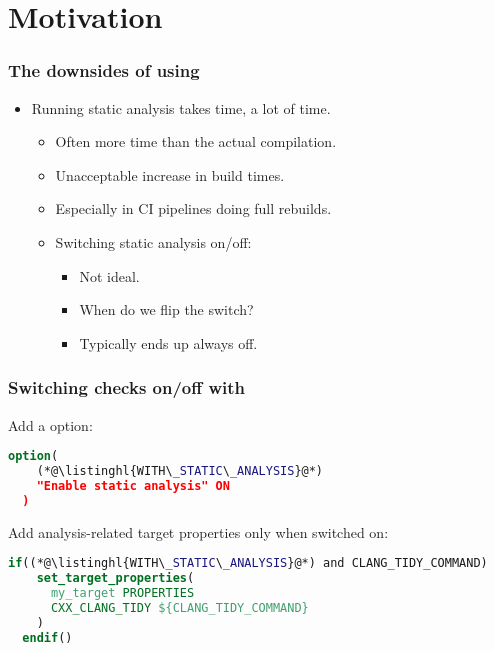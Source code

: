 \documentclass[compress,table,xcolor=table]{beamer}
\begin{document}
\section{Motivation}
\begin{frame}
  \Huge
\end{frame}
\begin{frame}
  \frametitle{The downsides of using }
    \LARGE
    \begin{itemize}
    \item Running static analysis takes time, {\larger a lot} of time.
        \Large
        \begin{itemize}
        \item Often more time than the actual compilation.
        \item Unacceptable increase in build times.
        \item Especially in CI pipelines doing full rebuilds.
        \item Switching static analysis on/off:
            \begin{itemize}
            \item Not ideal.
            \item When do we flip the switch?
            \item Typically ends up always off.
            \end{itemize}
        \end{itemize}
    \end{itemize}
\end{frame}
\begin{frame}[fragile]
  \frametitle{Switching  checks on/off with }
  \Large
   Add a  option:
  \begin{lstlisting}[language=cmake]
  option(
    (*@\listinghl{WITH\_STATIC\_ANALYSIS}@*)
    "Enable static analysis" ON
  )
  \end{lstlisting}

  Add analysis-related target properties only when switched on:

  \begin{lstlisting}[language=cmake]
  if((*@\listinghl{WITH\_STATIC\_ANALYSIS}@*) and CLANG_TIDY_COMMAND)
    set_target_properties(
      my_target PROPERTIES
      CXX_CLANG_TIDY ${CLANG_TIDY_COMMAND}
    )
  endif()
  \end{lstlisting}

\end{frame}
\end{document}
